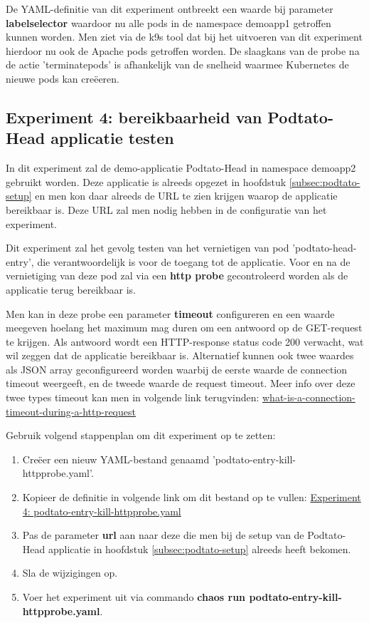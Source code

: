 De YAML-definitie van dit experiment ontbreekt een waarde bij parameter {\bf label\textunderscore selector} waardoor nu alle pods in de namespace demoapp1 getroffen kunnen worden. Men ziet via de k9s tool dat bij het uitvoeren van dit experiment hierdoor nu ook de Apache pods getroffen worden. De slaagkans van de probe na de actie 'terminate\textunderscore pods' is afhankelijk van de snelheid waarmee Kubernetes de nieuwe pods kan creëeren.  

\subsection{Experiment 4: bereikbaarheid van Podtato-Head applicatie testen}

In dit experiment zal de demo-applicatie Podtato-Head in namespace demoapp2 gebruikt worden. Deze applicatie is alreeds opgezet in hoofdstuk \ref{subsec:podtato-setup} en men kon daar alreeds de URL te zien krijgen waarop de applicatie bereikbaar is. Deze URL zal men nodig hebben in de configuratie van het experiment.

Dit experiment zal het gevolg testen van het vernietigen van pod 'podtato-head-entry', die verantwoordelijk is voor de toegang tot de applicatie. Voor en na de vernietiging van deze pod zal via een {\bf http probe} gecontroleerd worden als de applicatie terug bereikbaar is. \autocite{ChaosToolkit2022d}
 
Men kan in deze probe een parameter {\bf timeout} configureren en een waarde meegeven hoelang het maximum mag duren om een antwoord op de GET-request te krijgen. Als antwoord wordt een HTTP-response status code 200 verwacht, wat wil zeggen dat de applicatie bereikbaar is. Alternatief kunnen ook twee waardes als JSON array geconfigureerd worden waarbij de eerste waarde de connection timeout weergeeft,
en de tweede waarde de request timeout. Meer info over deze twee types timeout kan men in volgende link terugvinden: \href {https://stackoverflow.com/questions/49704708/what-is-a-connection-timeout-during-a-http-request}{what-is-a-connection-timeout-during-a-http-request}

Gebruik volgend stappenplan om dit experiment op te zetten:
\begin{enumerate}
  \item Creëer een nieuw YAML-bestand genaamd 'podtato-entry-kill-httpprobe.yaml'.
  \item Kopieer de definitie in volgende link om dit bestand op te vullen:
  \href{https://github.com/KenBruggeman/BP\textunderscore 21-22/blob/master/bachelorproef/docs/chaostoolkit%20experimenten/podtato-entry-kill-httpprobe.yaml}{Experiment 4: podtato-entry-kill-httpprobe.yaml}
  \item Pas de parameter {\bf url} aan naar deze die men bij de setup van de Podtato-Head applicatie in hoofdstuk \ref{subsec:podtato-setup} alreeds heeft bekomen.
  \item Sla de wijzigingen op.
  \item Voer het experiment uit via commando {\bf chaos run podtato-entry-kill-httpprobe.yaml}.
\end{enumerate} 

